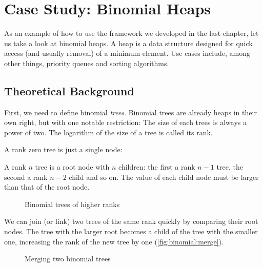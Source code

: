 
\chapter{Case Study: Binomial Heaps}
\label{ch:casestudyamortized}
As an example of how to use the framework we developed in the last chapter, let us take a look at binomial heaps. A heap is a data structure designed for quick access (and usually removal) of a minimum element. Use cases include, among other things, priority queues and sorting algorithms.

\section{Theoretical Background}
First, we need to define binomial \emph{trees}. Binomial trees are already heaps in their own right, but with one notable restriction: The size of each trees is always a power of two. The logarithm of the size of a tree is called its rank.

A rank zero tree is just a single node:

\begin{figure}[h]
\begin{center}
    
\end{center}
\end{figure}

A rank $n$ tree is a root node with $n$ children: the first a rank $n-1$ tree, the second a rank $n-2$ child and so on. The value of each child node must be larger than that of the root node.

\begin{figure}[h]
\begin{center}
    
\end{center}
\caption{Binomial trees of higher ranks}
\label{fig:binomial:rankn}
\end{figure}

We can join (or link) two trees of the same rank quickly by comparing their root nodes. The tree with the larger root becomes a child of the tree with the smaller one, increasing the rank of the new tree by one (\autoref{fig:binomial:merge}).

\begin{figure}[h]
\begin{center}
    
\end{center}
\caption{Merging two binomial trees}
\label{fig:binomial:merge}
\end{figure}

